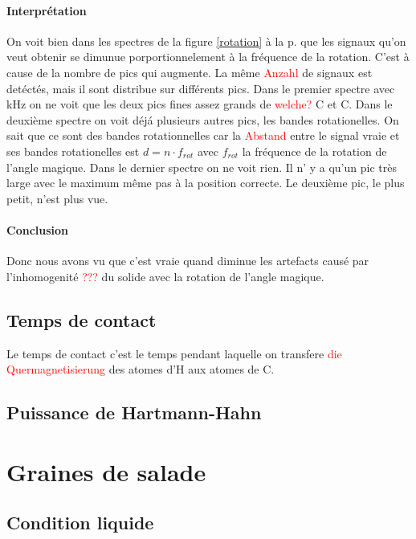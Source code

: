 \documentclass[a4paper,12pt]{scrartcl}
\begin{document}
   \paragraph{Interprétation}
    On voit bien dans les spectres de la figure \ref{rotation} à la p. \pageref{rotation} que les signaux qu'on veut obtenir se dimunue porportionnelement à la fréquence de la rotation. C'est à cause de la nombre de pics qui augmente. La même \textcolor{red}{Anzahl} de signaux est detéctés, mais il sont distribue sur différents pics. Dans le premier spectre avec \unit[4]{kHz} on ne voit que les deux pics fines assez grands de \textcolor{red}{welche?} C et C. Dans le deuxième spectre on voit déjá plusieurs autres pics, les bandes rotationelles. On sait que ce sont des bandes rotationnelles car la \textcolor{red}{Abstand} entre le signal vraie et ses bandes rotationelles est $d=n\cdot f_{rot}$ avec $f_{rot}$ la fréquence de la rotation de l'angle magique. Dans le dernier spectre on ne voit rien. Il n' y a qu'un pic très large avec le maximum même pas à la position correcte. Le deuxième pic, le plus petit, n'est plus vue.

   \paragraph{Conclusion}
    Donc nous avons vu que c'est vraie quand diminue les artefacts causé par l'inhomogenité \textcolor{red}{???} du solide avec la rotation de l'angle magique. 

  \subsection{Temps de contact}
   Le temps de contact c'est le temps pendant laquelle on transfere \textcolor{red}{die Quermagnetisierung} des atomes d'H aux atomes de C.

  \subsection{Puissance de Hartmann-Hahn}
 
 

 \section{Graines de salade}
  \subsection{Condition liquide}
 
\end{document}
